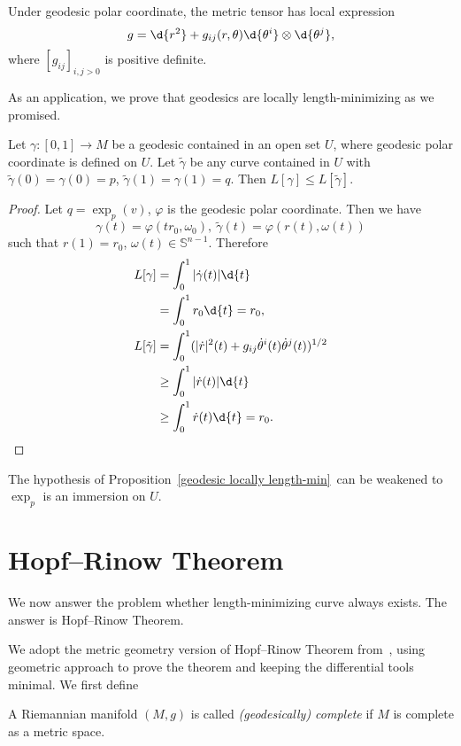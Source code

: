 \begin{cor}
    Under geodesic polar coordinate, the metric tensor has local expression
    \[g=\d{r^2}+g_{ij}(r,\theta)\d{\theta^i}\otimes\d{\theta^j},\]
    where $[g_{ij}]_{i,j>0}$ is positive definite.
\end{cor}

As an application, we prove that geodesics are locally length-minimizing as we promised.

\begin{prop}\label{geodesic locally length-min}
    Let $\gamma:[0,1]\to M$ be a geodesic contained in an open set $U$, where geodesic polar coordinate is defined on $U$.
    Let $\tilde\gamma$ be any curve contained in $U$ with $\tilde\gamma(0)=\gamma(0)=p$, $\tilde\gamma(1)=\gamma(1)=q$.
    Then $L[\gamma]\leq L[\tilde\gamma]$.
\end{prop}
\begin{proof}
    Let $q=\exp_p(v)$, $\varphi$ is the geodesic polar coordinate.
    Then we have
    \[\gamma(t)=\varphi(tr_0,\omega_0),\ \tilde\gamma(t)=\varphi(r(t),\omega(t))\]
    such that $r(1)=r_0$, $\omega(t)\in\mathbb{S}^{n-1}$.
    Therefore
    \begin{align*}
        L[\gamma]&=\int_0^1|\dot\gamma(t)|\d{t}\\
        &=\int_0^1r_0\d{t}=r_0,\\
        L[\tilde\gamma]&=\int_0^1(|\dot{r}|^2(t)+g_{ij}\dot\theta^i(t)\dot\theta^j(t))^{1/2}\\
        &\geq\int_0^1|\dot{r}(t)|\d{t}\\
        &\geq\int_0^1\dot{r}(t)\d{t}=r_0.\qedhere
    \end{align*}
\end{proof}

\begin{rem}
    The hypothesis of Proposition~\ref{geodesic locally length-min}~can be weakened to $\exp_p$ is an immersion on $U$.
\end{rem}

\section{Hopf--Rinow Theorem}

We now answer the problem whether length-minimizing curve always exists.
The answer is Hopf--Rinow Theorem.

We adopt the metric geometry version of Hopf--Rinow Theorem from~\cite{Burago}, using geometric approach to prove the theorem and keeping the differential tools minimal.
We first define
\begin{defn}
    A Riemannian manifold $(M,g)$ is called \emph{(geodesically) complete} if $M$ is complete as a metric space.
\end{defn}


